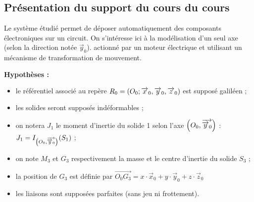 \documentclass[10pt,fleqn]{article} %
\begin{document}
\def\pathfig{images}

\vspace{4cm}
\pagestyle{fancy}
\thispagestyle{plain}

\def\columnseprulecolor{\color{ocre}}
\setlength{\columnseprule}{0.4pt} 

\def\pathfig{images}

\ifprof
\else
\begin{multicols}{2}
\fi


\subsection{Présentation du support du cours du cours}



\begin{exemple}
Le système étudié permet de déposer automatiquement des composants électroniques sur un circuit.
On s'intéresse ici à la modélisation d'un seul axe (selon la direction notée $\overrightarrow{y}_0$). actionné par un moteur électrique et utilisant un mécanisme de transformation de mouvement.

\textbf{Hypothèses :}
\begin{itemize}
\item le référentiel associé au repère $R_0=\left(O_0;\overrightarrow{x}_0,\overrightarrow{y}_0,\overrightarrow{z}_0 \right)$ est supposé galiléen ;
\item les solides seront supposés indéformables ; 
\item on notera $J_1$ le moment d'inertie du solide 1 selon l'axe $\left(O_0,\overrightarrow{\overrightarrow{y}_0}\right)$ : $J_1=I_{\left(O_0,\overrightarrow{\overrightarrow{y}_0}\right)}(S_1)$ ;
\item on note $M_3$ et $G_3$ respectivement la masse et le centre d'inertie du solide $S_3$ ;
\item la position de $G_3$ est définie par $\overrightarrow{O_0G_3}=x\cdot \overrightarrow{x}_0+y\cdot \overrightarrow{y}_0+z\cdot \overrightarrow{z}_0$
\item les liaisons sont supposées parfaites (sans jeu ni frottement).
\end{itemize}


\end{exemple}
\end{multicols}
\end{document}
